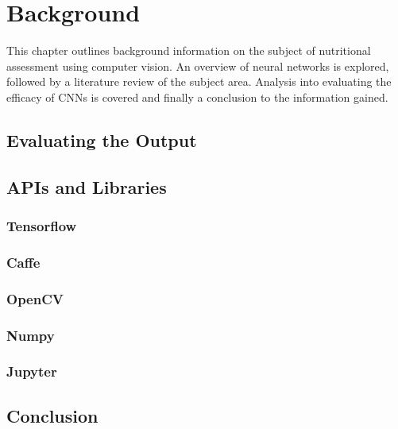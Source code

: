 \chapter{Background}
\label{background}

This chapter outlines background information on the subject of nutritional assessment using computer vision.
An overview of neural networks is explored, followed by a literature review of the subject area.
Analysis into evaluating the efficacy of CNNs is covered and finally a conclusion to the information gained.











\section{Evaluating the Output}




\section{APIs and Libraries}
\subsection*{Tensorflow}


\subsection*{Caffe}

\subsection*{OpenCV}


\subsection*{Numpy}


\subsection*{Jupyter}


\section{Conclusion}

